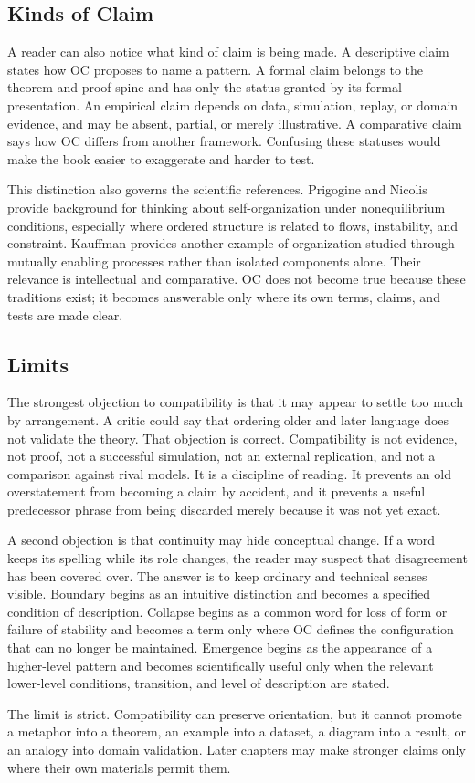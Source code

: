 \documentclass[11pt,a4paper,openany]{book}
\begin{document}
\subsection{Kinds of Claim}
A reader can also notice what kind of claim is being made. A descriptive claim states how OC proposes to name a pattern. A formal claim belongs to the theorem and proof spine and has only the status granted by its formal presentation. An empirical claim depends on data, simulation, replay, or domain evidence, and may be absent, partial, or merely illustrative. A comparative claim says how OC differs from another framework. Confusing these statuses would make the book easier to exaggerate and harder to test. \cite{prigogine_dissipative,haken_synergetics}\par
This distinction also governs the scientific references. Prigogine and Nicolis provide background for thinking about self-organization under nonequilibrium conditions, especially where ordered structure is related to flows, instability, and constraint. Kauffman provides another example of organization studied through mutually enabling processes rather than isolated components alone. Their relevance is intellectual and comparative. OC does not become true because these traditions exist; it becomes answerable only where its own terms, claims, and tests are made clear.\par
\subsection{Limits}
The strongest objection to compatibility is that it may appear to settle too much by arrangement. A critic could say that ordering older and later language does not validate the theory. That objection is correct. Compatibility is not evidence, not proof, not a successful simulation, not an external replication, and not a comparison against rival models. It is a discipline of reading. It prevents an old overstatement from becoming a claim by accident, and it prevents a useful predecessor phrase from being discarded merely because it was not yet exact. \cite{prigogine_dissipative,haken_synergetics}\par
A second objection is that continuity may hide conceptual change. If a word keeps its spelling while its role changes, the reader may suspect that disagreement has been covered over. The answer is to keep ordinary and technical senses visible. Boundary begins as an intuitive distinction and becomes a specified condition of description. Collapse begins as a common word for loss of form or failure of stability and becomes a term only where OC defines the configuration that can no longer be maintained. Emergence begins as the appearance of a higher-level pattern and becomes scientifically useful only when the relevant lower-level conditions, transition, and level of description are stated.\par
The limit is strict. Compatibility can preserve orientation, but it cannot promote a metaphor into a theorem, an example into a dataset, a diagram into a result, or an analogy into domain validation. Later chapters may make stronger claims only where their own materials permit them.\par
\end{document}
